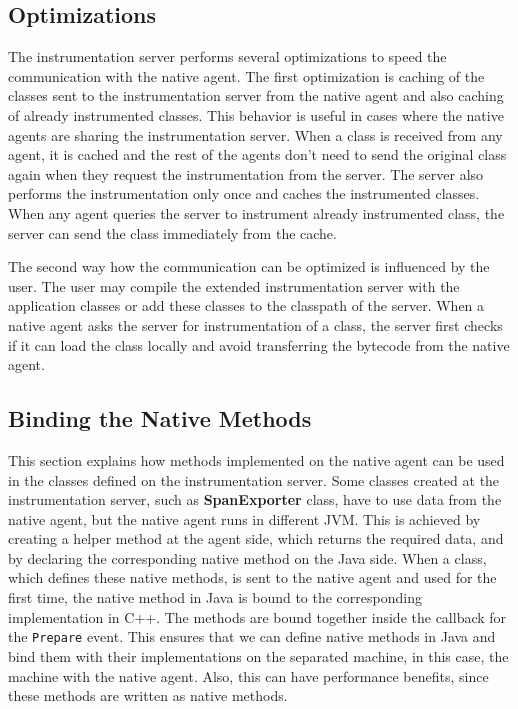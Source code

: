 \subsection{Optimizations}
The instrumentation server performs several optimizations to speed the communication with the native agent. The first optimization is caching of the classes sent to the instrumentation server from the native agent and also caching of already instrumented classes. This behavior is useful in cases where the native agents are sharing the instrumentation server. When a class is received from any agent, it is cached and the rest of the agents don't need to send the original class again when they request the instrumentation from the server. The server also performs the instrumentation only once and caches the instrumented classes. When any agent queries the server to instrument already instrumented class, the server can send the class immediately from the cache.

The second way how the communication can be optimized is influenced by the user. The user may compile the extended instrumentation server with the application classes or add these classes to the classpath of the server. When a native agent asks the server for instrumentation of a class, the server first checks if it can load the class locally and avoid transferring the bytecode from the native agent. 

\subsection{Binding the Native Methods}
This section explains how methods implemented on the native agent can be used in the classes defined on the instrumentation server. Some classes created at the instrumentation server, such as \textbf{SpanExporter} class, have to use data from the native agent, but the native agent runs in different JVM. This is achieved by creating a helper method at the agent side, which returns the required data, and by declaring the corresponding native method on the Java side. When a class, which defines these native methods, is sent to the native agent and used for the first time, the native method in Java is bound to the corresponding implementation in C++. The methods are bound together inside the callback for the \texttt{Prepare} event. This ensures that we can define native methods in Java and bind them with their implementations on the separated machine, in this case, the machine with the native agent. Also, this can have performance benefits, since these methods are written as native methods.

